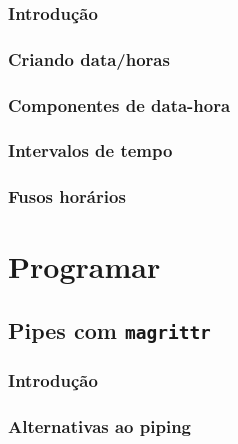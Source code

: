 \documentclass[
]{latex/krantz}
\theoremstyle{definition}
\theoremstyle{definition}
\theoremstyle{definition}
\theoremstyle{definition}
\theoremstyle{remark}
\begin{document}
\hypertarget{introduuxe7uxe3o-9}{%
\section{Introdução}\label{introduuxe7uxe3o-9}}

\hypertarget{criando-datahoras}{%
\section{Criando data/horas}\label{criando-datahoras}}

\hypertarget{componentes-de-data-hora}{%
\section{Componentes de data-hora}\label{componentes-de-data-hora}}

\hypertarget{intervalos-de-tempo}{%
\section{Intervalos de tempo}\label{intervalos-de-tempo}}

\hypertarget{fusos-horuxe1rios}{%
\section{Fusos horários}\label{fusos-horuxe1rios}}

\hypertarget{part-programar}{%
\part{Programar}\label{part-programar}}

\hypertarget{pipes-com-magrittr}{%
\chapter{\texorpdfstring{Pipes com \texttt{magrittr}}{Pipes com magrittr}}\label{pipes-com-magrittr}}

\hypertarget{introduuxe7uxe3o-10}{%
\section{Introdução}\label{introduuxe7uxe3o-10}}

\hypertarget{alternativas-ao-piping}{%
\section{Alternativas ao piping}\label{alternativas-ao-piping}}
\end{document}
